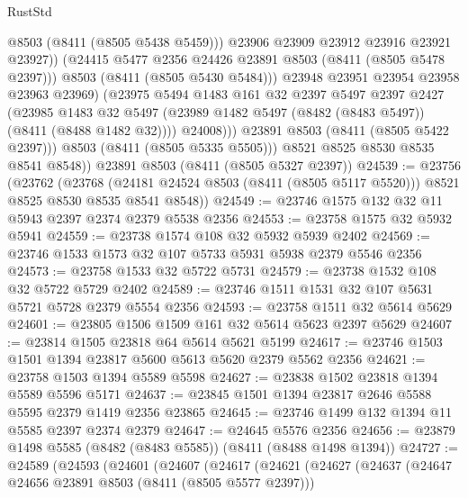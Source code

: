 \begin{lexlean}{RustStd}
\begin{coremodule}
                          @8503
                          (@8411 (@8505 @5438 @5459)))
                        @23906
                        @23909
                        @23912
                        @23916
                        @23921
                        @23927))
                    (@24415 @5477 @2356 @24426 @23891 @8503 (@8411 (@8505 @5478 @2397)))
                    @8503
                    (@8411 (@8505 @5430 @5484)))
                  @23948
                  @23951
                  @23954
                  @23958
                  @23963
                  @23969)
                (@23975
                  @5494
                  @1483
                  @161
                  @32
                  @2397
                  @5497
                  @2397
                  @2427
                  (@23985
                    @1483
                    @32
                    @5497
                    (@23989 @1482 @5497 (@8482 (@8483 @5497)) (@8411 (@8488 @1482 @32))))
                  @24008)))
            @23891
            @8503
            (@8411 (@8505 @5422 @2397)))
          @8503
          (@8411 (@8505 @5335 @5505)))
        @8521
        @8525
        @8530
        @8535
        @8541
        @8548))
    @23891
    @8503
    (@8411 (@8505 @5327 @2397))
@24539 := @23756
    (@23762
      (@23768
        (@24181 @24524 @8503 (@8411 (@8505 @5117 @5520)))
        @8521
        @8525
        @8530
        @8535
        @8541
        @8548))
@24549 := @23746 @1575 @132 @32 @11 @5943 @2397 @2374 @2379 @5538 @2356
@24553 := @23758 @1575 @32 @5932 @5941
@24559 := @23738 @1574 @108 @32 @5932 @5939 @2402
@24569 := @23746 @1533 @1573 @32 @107 @5733 @5931 @5938 @2379 @5546 @2356
@24573 := @23758 @1533 @32 @5722 @5731
@24579 := @23738 @1532 @108 @32 @5722 @5729 @2402
@24589 := @23746 @1511 @1531 @32 @107 @5631 @5721 @5728 @2379 @5554 @2356
@24593 := @23758 @1511 @32 @5614 @5629
@24601 := @23805 @1506 @1509 @161 @32 @5614 @5623 @2397 @5629
@24607 := @23814 @1505 @23818 @64 @5614 @5621 @5199
@24617 := @23746 @1503 @1501 @1394 @23817 @5600 @5613 @5620 @2379 @5562 @2356
@24621 := @23758 @1503 @1394 @5589 @5598
@24627 := @23838 @1502 @23818 @1394 @5589 @5596 @5171
@24637 := @23845 @1501 @1394 @23817 @2646 @5588 @5595 @2379 @1419 @2356 @23865
@24645 := @23746 @1499 @132 @1394 @11 @5585 @2397 @2374 @2379
@24647 := @24645 @5576 @2356
@24656 := @23879 @1498 @5585 (@8482 (@8483 @5585)) (@8411 (@8488 @1498 @1394))
@24727 := @24589
    (@24593
      (@24601
        (@24607
          (@24617
            (@24621
              (@24627
                (@24637
                  (@24647 @24656 @23891 @8503 (@8411 (@8505 @5577 @2397)))

\end{coremodule}
\end{lexlean}
